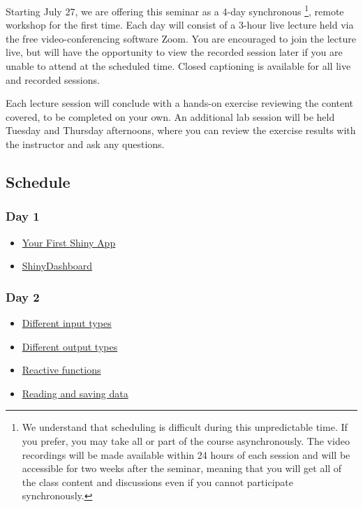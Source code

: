 \documentclass[
]{book}
\providecommand{\tightlist}{%
  \setlength{\itemsep}{0pt}\setlength{\parskip}{0pt}}
\begin{document}
Starting July 27, we are offering this seminar as a 4-day synchronous \footnote{We understand that scheduling is difficult during this unpredictable time. If you prefer, you may take all or part of the course asynchronously. The video recordings will be made available within 24 hours of each session and will be accessible for two weeks after the seminar, meaning that you will get all of the class content and discussions even if you cannot participate synchronously.}, remote workshop for the first time. Each day will consist of a 3-hour live lecture held via the free video-conferencing software Zoom. You are encouraged to join the lecture live, but will have the opportunity to view the recorded session later if you are unable to attend at the scheduled time. Closed captioning is available for all live and recorded sessions.

Each lecture session will conclude with a hands-on exercise reviewing the content covered, to be completed on your own. An additional lab session will be held Tuesday and Thursday afternoons, where you can review the exercise results with the instructor and ask any questions.

\hypertarget{schedule}{%
\subsection{Schedule}\label{schedule}}

\hypertarget{day-1}{%
\subsubsection{Day 1}\label{day-1}}

\begin{itemize}
\tightlist
\item
  \protect\hyperlink{first-app}{Your First Shiny App}
\item
  \protect\hyperlink{shinydashboard}{ShinyDashboard}
\end{itemize}

\hypertarget{day-2}{%
\subsubsection{Day 2}\label{day-2}}

\begin{itemize}
\tightlist
\item
  \protect\hyperlink{inputs}{Different input types}
\item
  \protect\hyperlink{outputs}{Different output types}
\item
  \protect\hyperlink{reactives}{Reactive functions}
\item
  \protect\hyperlink{data}{Reading and saving data}
\end{itemize}
\end{document}
